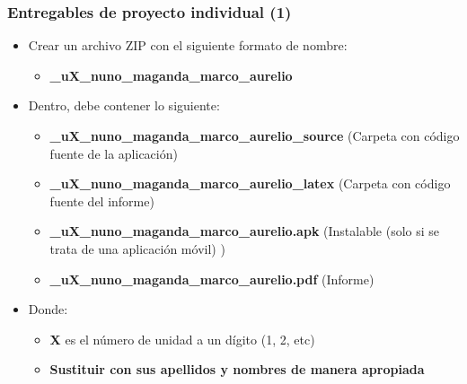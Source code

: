 

\begin{frame}
\frametitle{Entregables de proyecto individual (1)}
    \begin{itemize}
    \item Crear un archivo ZIP con el siguiente formato de nombre:
    \begin{itemize}
        \item \textbf{\clavegrupo\_uX\_nuno\_maganda\_marco\_aurelio}
    \end{itemize}
    \item Dentro, debe contener lo siguiente:
        \begin{itemize}
        \item \textbf{\clavegrupo\_uX\_nuno\_maganda\_marco\_aurelio\_source} (Carpeta con c\'odigo fuente de la aplicaci\'on)
        \item \textbf{\clavegrupo\_uX\_nuno\_maganda\_marco\_aurelio\_latex} (Carpeta con c\'odigo fuente del informe)
        \item \textbf{\clavegrupo\_uX\_nuno\_maganda\_marco\_aurelio.apk} (Instalable (solo si se trata de una aplicación móvil) )
        \item \textbf{\clavegrupo\_uX\_nuno\_maganda\_marco\_aurelio.pdf} (Informe)
        \end{itemize}
    \item Donde:
        \begin{itemize}
        \item \textbf{X} es el n\'umero de unidad a un d\'igito (1, 2, etc)
        \item \textbf{Sustituir con sus apellidos y nombres de manera apropiada} 
        \end{itemize}
    \end{itemize}
\end{frame}


